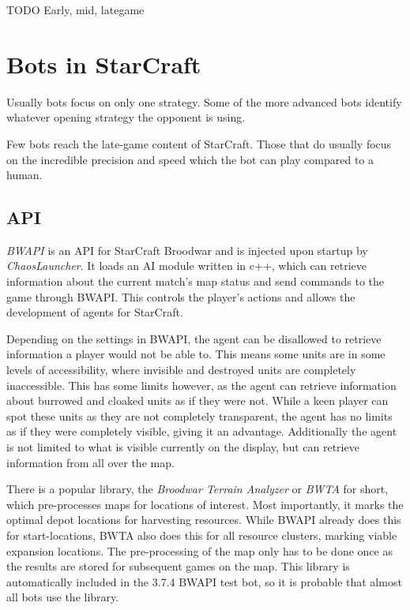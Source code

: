 TODO Early, mid, lategame

\section{Bots in StarCraft}
Usually bots focus on only one strategy. Some of the more advanced bots identify whatever opening strategy the opponent is using.

Few bots reach the late-game content of StarCraft. Those that do usually focus on the incredible precision and speed which the bot can play compared to a human.


	\subsection*{API}
	\emph{BWAPI} is an API for StarCraft Broodwar and is injected upon startup by \emph{ChaosLauncher}. It loads an AI module written in c++, which can retrieve information about the current match's map status and send commands to the game through BWAPI. This controls the player's actions and allows the development of agents for StarCraft.
	
	Depending on the settings in BWAPI, the agent can be disallowed to retrieve information a player would not be able to. This means some units are in some levels of accessibility, where invisible and destroyed units are completely inaccessible. This has some limits however, as the agent can retrieve information about burrowed and cloaked units as if they were not. While a keen player can spot these units as they are not completely transparent, the agent has no limits as if they were completely visible, giving it an advantage. Additionally the agent is not limited to what is visible currently on the display, but can retrieve information from all over the map.
	
	There is a popular library, the \emph{Broodwar Terrain Analyzer} or \emph{BWTA} for short, which pre-processes maps for locations of interest. Most importantly, it marks the optimal depot locations for harvesting resources. While BWAPI already does this for start-locations, BWTA also does this for all resource clusters, marking viable expansion locations. The pre-processing of the map only has to be done once as the results are stored for subsequent games on the map. This library is automatically included in the 3.7.4 BWAPI test bot, so it is probable that almost all bots use the library.
	
